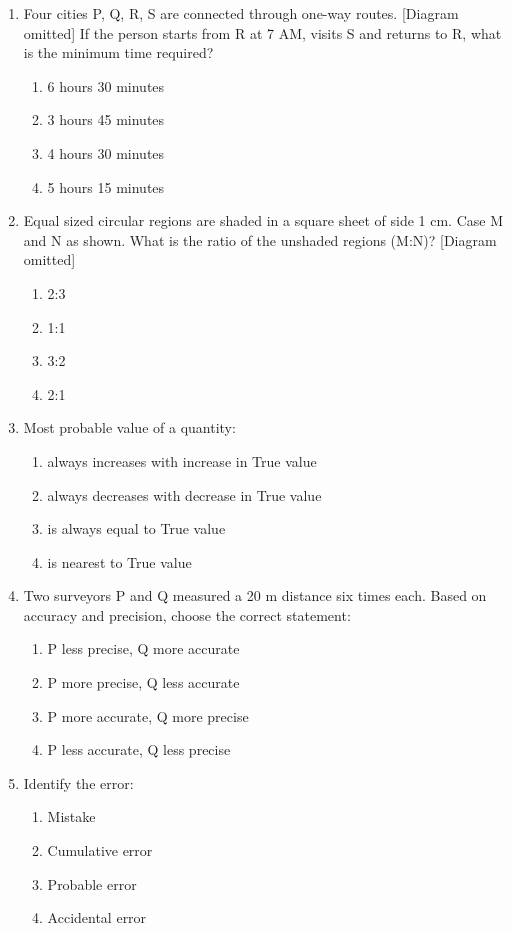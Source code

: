 \documentclass[12pt,a4paper]{article}
\begin{document}
\begin{enumerate}
\item Four cities P, Q, R, S are connected through one-way routes. [Diagram omitted] If the person starts from R at 7 AM, visits S and returns to R, what is the minimum time required?
\begin{enumerate}
    \item 6 hours 30 minutes
    \item 3 hours 45 minutes
    \item 4 hours 30 minutes
    \item 5 hours 15 minutes
\end{enumerate}

\item Equal sized circular regions are shaded in a square sheet of side 1 cm. Case M and N as shown. What is the ratio of the unshaded regions (M:N)? [Diagram omitted]
\begin{enumerate}
    \item 2:3
    \item 1:1
    \item 3:2
    \item 2:1
\end{enumerate}

\item Most probable value of a quantity:
\begin{enumerate}
    \item always increases with increase in True value
    \item always decreases with decrease in True value
    \item is always equal to True value
    \item is nearest to True value
\end{enumerate}

\item Two surveyors P and Q measured a 20 m distance six times each. Based on accuracy and precision, choose the correct statement:
\begin{enumerate}
    \item P less precise, Q more accurate
    \item P more precise, Q less accurate
    \item P more accurate, Q more precise
    \item P less accurate, Q less precise
\end{enumerate}

\item Identify the error:
\begin{enumerate}
    \item Mistake
    \item Cumulative error
    \item Probable error
    \item Accidental error
\end{enumerate}


\end{enumerate}
\end{document}
